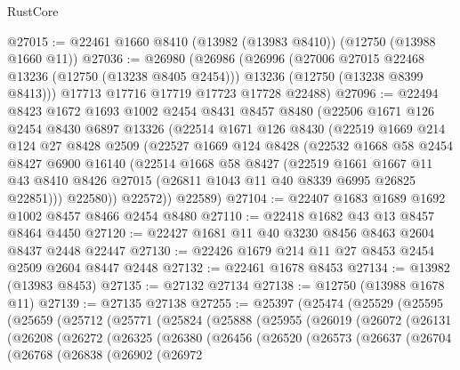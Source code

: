 \begin{lexlean}{RustCore}
\begin{coremodule}
@27015 := @22461 @1660 @8410 (@13982 (@13983 @8410)) (@12750 (@13988 @1660 @11))
@27036 := @26980
    (@26986
      (@26996
        (@27006 @27015 @22468 @13236 (@12750 (@13238 @8405 @2454)))
        @13236
        (@12750 (@13238 @8399 @8413)))
      @17713
      @17716
      @17719
      @17723
      @17728
      @22488)
@27096 := @22494
    @8423
    @1672
    @1693
    @1002
    @2454
    @8431
    @8457
    @8480
    (@22506
      @1671
      @126
      @2454
      @8430
      @6897
      @13326
      (@22514
        @1671
        @126
        @8430
        (@22519
          @1669
          @214
          @124
          @27
          @8428
          @2509
          (@22527
            @1669
            @124
            @8428
            (@22532
              @1668
              @58
              @2454
              @8427
              @6900
              @16140
              (@22514
                @1668
                @58
                @8427
                (@22519
                  @1661
                  @1667
                  @11
                  @43
                  @8410
                  @8426
                  @27015
                  (@26811 @1043 @11 @40 @8339 @6995 @26825 @22851)))
              @22580))
          @22572))
      @22589)
@27104 := @22407 @1683 @1689 @1692 @1002 @8457 @8466 @2454 @8480
@27110 := @22418 @1682 @43 @13 @8457 @8464 @4450
@27120 := @22427 @1681 @11 @40 @3230 @8456 @8463 @2604 @8437 @2448 @22447
@27130 := @22426 @1679 @214 @11 @27 @8453 @2454 @2509 @2604 @8447 @2448
@27132 := @22461 @1678 @8453
@27134 := @13982 (@13983 @8453)
@27135 := @27132 @27134
@27138 := @12750 (@13988 @1678 @11)
@27139 := @27135 @27138
@27255 := @25397
    (@25474
      (@25529
        (@25595
          (@25659
            (@25712
              (@25771
                (@25824
                  (@25888
                    (@25955
                      (@26019
                        (@26072
                          (@26131
                            (@26208
                              (@26272
                                (@26325
                                  (@26380
                                    (@26456
                                      (@26520
                                        (@26573
                                          (@26637
                                            (@26704
                                              (@26768
                                                (@26838
                                                  (@26902
                                                    (@26972

\end{coremodule}
\end{lexlean}
